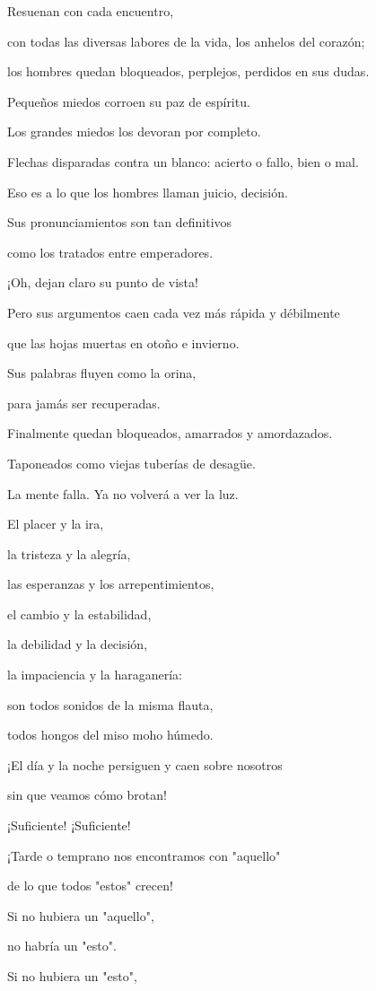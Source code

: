 Resuenan con cada encuentro,

con todas las diversas labores de la vida, los anhelos del corazón;

los hombres quedan bloqueados, perplejos, perdidos en sus dudas.

Pequeños miedos corroen su paz de espíritu.

Los grandes miedos los devoran por completo.

Flechas disparadas contra un blanco: acierto o fallo, bien o mal.

Eso es a lo que los hombres llaman juicio, decisión.

Sus pronunciamientos son tan definitivos

como los tratados entre emperadores.

¡Oh, dejan claro su punto de vista!

Pero sus argumentos caen cada vez más rápida y débilmente

que las hojas muertas en otoño e invierno.

Sus palabras fluyen como la orina,

para jamás ser recuperadas.

Finalmente quedan bloqueados, amarrados y amordazados.

Taponeados como viejas tuberías de desagüe.

La mente falla. Ya no volverá a ver la luz.

El placer y la ira,

la tristeza y la alegría,

las esperanzas y los arrepentimientos,

el cambio y la estabilidad,

la debilidad y la decisión,

la impaciencia y la haraganería:

son todos sonidos de la misma flauta,

todos hongos del miso moho húmedo.

¡El día y la noche persiguen y caen sobre nosotros

sin que veamos cómo brotan!

¡Suficiente! ¡Suficiente!

¡Tarde o temprano nos encontramos con "aquello"

de lo que todos "estos" crecen!

Si no hubiera un "aquello",

no habría un "esto".

Si no hubiera un "esto",

